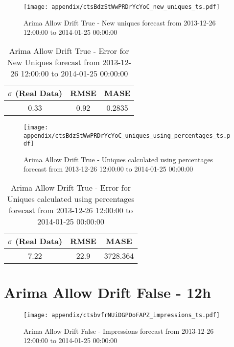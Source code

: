 \begin{figure}[H] \begin{center} \leavevmode
\texttt{[image: appendix/ctsBdzStWwPRDrYcYoC\_new\_uniques\_ts.pdf]} \caption{
Arima Allow Drift True - New uniques forecast from 2013-12-26 12:00:00 to 2014-01-25 00:00:00} \label{fig:appendix/ctsBdzStWwPRDrYcYoC_new_uniques_ts.pdf} \end{center}
\end{figure}

\begin{table}[H]
\centering
\footnotesize
\begin{tabular}{ccc}
$\sigma$ (Real Data) & RMSE & MASE   \\ \hline
0.33 & 0.92 & 0.2835 \\
\end{tabular}

\vspace{0.5cm}

\caption{
Arima Allow Drift True - Error for New Uniques forecast from 2013-12-26 12:00:00 to 2014-01-25 00:00:00}
\end{table}

\begin{figure}[H] \begin{center} \leavevmode
\texttt{[image: appendix/ctsBdzStWwPRDrYcYoC\_uniques\_using\_percentages\_ts.pdf]} \caption{
Arima Allow Drift True - Uniques calculated using percentages forecast from 2013-12-26 12:00:00 to 2014-01-25 00:00:00} \label{fig:appendix/ctsBdzStWwPRDrYcYoC_uniques_using_percentages_ts.pdf} \end{center}
\end{figure}

\begin{table}[H]
\centering
\footnotesize
\begin{tabular}{ccc}
$\sigma$ (Real Data) & RMSE & MASE   \\ \hline
7.22 & 22.9 & 3728.364 \\
\end{tabular}

\vspace{0.5cm}

\caption{
Arima Allow Drift True - Error for Uniques calculated using percentages forecast from 2013-12-26 12:00:00 to 2014-01-25 00:00:00}
\end{table}

\section{Arima Allow Drift False - 12h}
\begin{figure}[H] \begin{center} \leavevmode
\texttt{[image: appendix/ctsbvfrNUiDGPDoFAPZ\_impressions\_ts.pdf]} \caption{
Arima Allow Drift False - Impressions forecast from 2013-12-26 12:00:00 to 2014-01-25 00:00:00} \label{fig:appendix/ctsbvfrNUiDGPDoFAPZ_impressions_ts.pdf} \end{center}
\end{figure}

